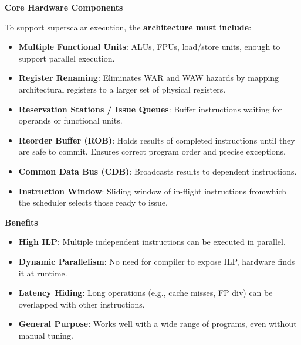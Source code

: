 \highspace
\begin{flushleft}
    \textcolor{Green3}{ \textbf{Core Hardware Components}}
\end{flushleft}
To support superscalar execution, the \textbf{architecture must include}:
\begin{itemize}
    \item \textbf{Multiple Functional Units}: ALUs, FPUs, load/store units, enough to support parallel execution.
  
    \item \textbf{Register Renaming}: Eliminates WAR and WAW hazards by mapping architectural registers to a larger set of physical registers.
  
    \item \textbf{Reservation Stations / Issue Queues}: Buffer instructions waiting for operands or functional units.
  
    \item \textbf{Reorder Buffer (ROB)}: Holds results of completed instructions until they are safe to commit. Ensures correct program order and precise exceptions.
  
    \item \textbf{Common Data Bus (CDB)}: Broadcasts results to dependent instructions.
  
    \item \textbf{Instruction Window}: Sliding window of in-flight instructions from\break which the scheduler selects those ready to issue.
\end{itemize}

\highspace
\begin{flushleft}
    \textcolor{Green3}{ \textbf{Benefits}}
\end{flushleft}
\begin{itemize}[label=\textcolor{Green3}{}]
    \item \textcolor{Green3}{\textbf{High ILP}}: Multiple independent instructions can be executed in parallel.
    \item \textcolor{Green3}{\textbf{Dynamic Parallelism}}: No need for compiler to expose ILP, hardware finds it at runtime.
    \item \textcolor{Green3}{\textbf{Latency Hiding}}: Long operations (e.g., cache misses, FP div) can be overlapped with other instructions.
    \item \textcolor{Green3}{\textbf{General Purpose}}: Works well with a wide range of programs, even without manual tuning.
\end{itemize}

